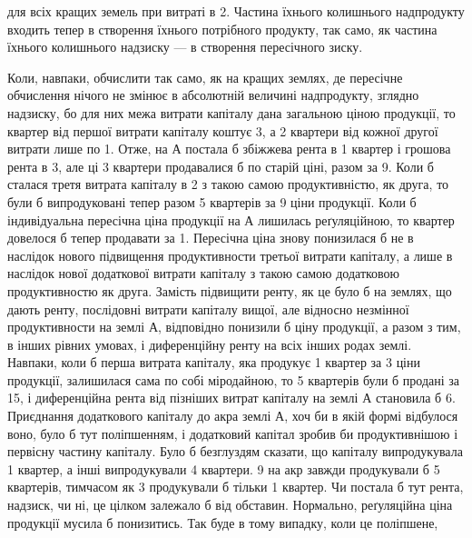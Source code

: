 \parcont{}  %
для всіх кращих земель при витраті в 2. Частина їхнього колишнього
надпродукту входить тепер в створення їхнього потрібного продукту, так
само, як частина їхнього колишнього надзиску — в створення пересічного зиску.

Коли, навпаки, обчислити так само, як на кращих землях, де пересічне обчислення
нічого не змінює в абсолютній величині надпродукту, зглядно надзиску, бо для
них межа витрати капіталу дана загальною ціною продукції, то квартер від першої
витрати капіталу коштує 3, а 2 квартери від кожної другої витрати
лише по 1. Отже, на $А$ постала б збіжжева рента в 1 квартер
і грошова рента в 3, але ці 3 квартери продавалися б по старій
ціні, разом за 9. Коли б сталася третя витрата капіталу в 2 з такою самою продуктивністю, як друга, то були б випродуковані тепер
разом 5 квартерів за 9 ціни продукції. Коли б індивідуальна
пересічна ціна продукції на $А$ лишилась реґуляційною, то квартер довелося б
тепер продавати за 1. Пересічна ціна знову понизилася б не в
наслідок нового підвищення продуктивности третьої витрати капіталу, а лише в
наслідок нової додаткової витрати капіталу з такою самою додатковою продуктивностю
як друга. Замість підвищити ренту, як це було б на землях, що дають
ренту, послідовні витрати капіталу вищої, але відносно незмінної продуктивности
на землі $А$, відповідно понизили б ціну продукції, а разом з тим, в інших
рівних умовах, і диференційну ренту на всіх інших родах землі. Навпаки,
коли б перша витрата капіталу, яка продукує 1 квартер за 3 ціни
продукції, залишилася сама по собі міродайною, то 5 квартерів були б продані
за 15, і диференційна рента від пізніших витрат капіталу на землі
$А$ становила б 6. Приєднання додаткового капіталу до акра землі $А$,
хоч би в якій формі відбулося воно, було б тут поліпшенням, і додатковий
капітал зробив би продуктивнішою і первісну частину капіталу. Було б безглуздям
сказати, що   капіталу випродукувала 1 квартер, а інші  випродукували
4 квартери. 9 на акр завжди продукували б 5 квартерів, тимчасом
як 3 продукували б тільки 1 квартер. Чи постала б тут рента, надзиск,
чи ні, це цілком залежало б від обставин. Нормально, реґуляційна ціна
продукції мусила б понизитись. Так буде в тому випадку, коли це поліпшене,
